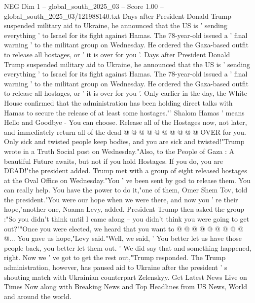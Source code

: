 \begin{textsample}{NEG Dim 1 – global\_south\_2025\_03 – Score 1.00 – global\_south\_2025\_03/121988140.txt}  \label{ex:f1_neg_179}
Days after President Donald Trump suspended military aid to Ukraine, he announced that the US is ' sending everything ' to Israel for its fight against Hamas.
The 78-year-old issued a ' final warning ' to the militant group on Wednesday.
He ordered the Gaza-based outfit to release all hostages, or ' it is over for you '.
Days after President Donald Trump suspended military aid to Ukraine, he announced that the US is ' sending everything ' to Israel for its fight against Hamas.
The 78-year-old issued a ' final warning ' to the militant group on Wednesday.
He ordered the Gaza-based outfit to release all hostages, or ' it is over for you '.
Only earlier in the day, the White House confirmed that the administration has been holding direct talks with Hamas to secure the release of at least some hostages."' Shalom Hamas ' means Hello and Goodbye - You can choose.
Release all of the Hostages now, not later, and immediately return all of the dead @ @ @ @ @ @ @ @ @ @ OVER for you.
Only sick and twisted people keep bodies, and you are sick and twisted!"Trump wrote in a Truth Social post on Wednesday."Also, to the People of Gaza : A beautiful Future awaits, but not if you hold Hostages.
If you do, you are DEAD!"the president added.
Trump met with a group of eight released hostages at the Oval Office on Wednesday."You ' ve been sent by god to release them.
You can really help.
You have the power to do it,"one of them, Omer Shem Tov, told the president."You were our hope when we were there, and now you ' re their hope,"another one, Naama Levy, added.
President Trump then asked the group :"So you didn't think until I came along -- you didn't think you were going to get out?""Once you were elected, we heard that you want to @ @ @ @ @ @ @ @ @ @...
You gave us hope,"Levy said."Well, we said, ' You better let us have those people back, you better let them out. ' We did say that and something happened, right.
Now we ' ve got to get the rest out,"Trump responded.
The Trump administration, however, has paused aid to Ukraine after the president ' s shouting match with Ukrainian counterpart Zelenskyy.
Get Latest News Live on Times Now along with Breaking News and Top Headlines from US News, World and around the world.

\end{textsample}
